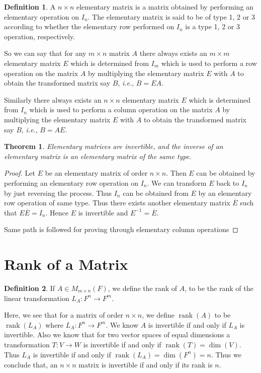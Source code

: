 \documentclass[12pt, a4paper]{article}
\newtheorem{theorem}{Theorem}[section]
\theoremstyle{definition}
\newtheorem{definition}{Definition}[section]
\theoremstyle{remark}
\DeclareMathOperator{\rank}{rank}
\begin{document}
\begin{definition}
    A $n \times n$ elementary matrix is a matrix obtained by performing an elementary operation on $I_n$. The elementary matrix is said to be of type 1, 2 or 3 according to whether the elementary row performed on $I_n$ is a type 1, 2 or 3 operation, respectively.
\end{definition}

So we can say that for any $m \times n$ matrix $A$ there always exists an $m \times m$ elementary matrix $E$ which is determined from $I_m$ which is used to perform a row operation on the matrix $A$ by multiplying the elementary matrix $E$ with $A$ to obtain the transformed matrix say $B$, \textit{i.e.}, $B = EA$.

Similarly there always exists an $n \times n$ elementary matrix $E$ which is determined from $I_n$ which is used to perform a column operation on the matrix $A$ by multiplying the elementary matrix $E$ with $A$ to obtain the transformed matrix say $B$, \textit{i.e.}, $B = AE$.

\begin{theorem}
    Elementary matrices are invertible, and the inverse of an elementary matrix is an elementary matrix of the same type.
\end{theorem}

\begin{proof}
    Let $E$ be an elementary matrix of order $n \times n$. Then $E$ can be obtained by performing an elementary row operation on $I_n$. We can transform $E$ back to $I_n$ by just reversing the process. Thus $I_n$ can be obtained from $E$ by an elementary row operation of same type. Thus there exists another elementary matrix $\overline{E}$ such that $E\overline{E} = I_n$. Hence $E$ is invertible and $E^{-1} = \overline{E}$.

    Same path is followed for proving through elementary column operations
\end{proof}

\section{Rank of a Matrix}
\begin{definition}
    If $A \in M_{m \times n}(F)$, we define the rank of $A$, to be the rank of the linear transformation $L_A:F^n \to F^m$.
\end{definition}

Here, we see that for a matrix of order $n \times n$, we define $\rank(A)$ to be $\rank(L_A)$ where $L_A:F^n \to F^m$. We know $A$ is invertible if and only if $L_A$ is invertible. Also we know that for two vector spaces of equal dimensions a transformation $T:V \to W$ is invertible if and only if $\rank(T) = \dim(V)$. Thus $L_A$ is invertible if and only if $\rank(L_A) = \dim(F^n) = n$. Thus we conclude that, an $n \times n$ matrix is invertible if and only if its rank is $n$.
\end{document}
